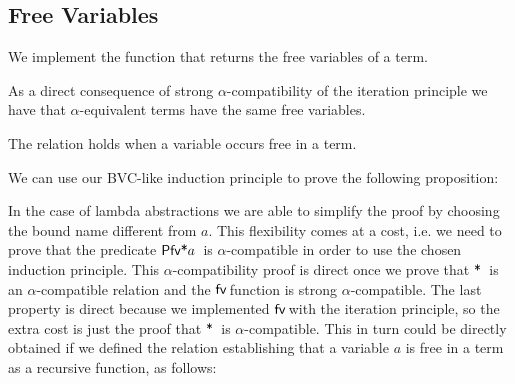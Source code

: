 \documentclass{entcs}
\newcommand{\alp}{\ensuremath{\alpha}}
\newcommand{\lambAg}[2]{\ensuremath{\AgdaInductiveConstructor{ƛ}\, #1\, #2}}
\newcommand{\inAg}{\ensuremath{\mathbin{\AgdaFunction{∈}}}}
\newcommand{\neqAg}{\ensuremath{\mathbin{\AgdaInductiveConstructor{≢}}}}
\newcommand{\fv}{\ensuremath{{\AgdaFunction{fv}}\,}}
\newcommand{\perm}{\ensuremath{\mathbin{\AgdaFunction{∙}}}}
\newcommand{\free}{\ensuremath{\mathbin{\AgdaFunction{*}}}}
\newcommand{\choiceAg}{\ensuremath{\AgdaFunction{χ}\,}}
\begin{document}
\subsection{Free Variables}
\label{sec:freevar}

We implement the function that returns the free variables of a term.


\noindent As a direct consequence of strong \alp-compatibility of the iteration principle we have that \alp-equivalent terms have the same free variables. 

The relation \AgdaFunction{\_*\_} holds when a variable occurs free in a term.

\AgdaTarget{*}

\noindent We can use our BVC-like induction principle to prove the following proposition:


\noindent In the  case of lambda abstractions we are able to simplify the proof by choosing the bound name different from $a$. 
This flexibility comes at a cost, i.e. we need to prove that the predicate $\AgdaFunction{Pfv*} a$\ is \alp-compatible in order to use the chosen induction principle. This \alp-compatibility proof is direct once we prove that \free\ is an \alp-compatible relation and the \fv function is strong \alp-compatible. The last property is direct because we implemented \fv with the iteration principle, so the extra cost is just the proof that \free\ is \alp-compatible. This in turn could be directly obtained if we defined the relation establishing that a variable $a$ is free in a term as a recursive function, as follows:
\end{document}
